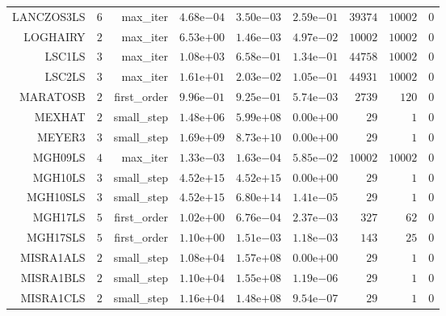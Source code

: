\begin{longtable}{rrrrrrrrr}
LANCZOS3LS & \(     6\) & max\_iter & \( 4.68\)e\(-04\) & \( 3.50\)e\(-03\) & \( 2.59\)e\(-01\) & \( 39374\) & \( 10002\) & \(     0\) \\
LOGHAIRY & \(     2\) & max\_iter & \( 6.53\)e\(+00\) & \( 1.46\)e\(-03\) & \( 4.97\)e\(-02\) & \( 10002\) & \( 10002\) & \(     0\) \\
LSC1LS & \(     3\) & max\_iter & \( 1.08\)e\(+03\) & \( 6.58\)e\(-01\) & \( 1.34\)e\(-01\) & \( 44758\) & \( 10002\) & \(     0\) \\
LSC2LS & \(     3\) & max\_iter & \( 1.61\)e\(+01\) & \( 2.03\)e\(-02\) & \( 1.05\)e\(-01\) & \( 44931\) & \( 10002\) & \(     0\) \\
MARATOSB & \(     2\) & first\_order & \( 9.96\)e\(-01\) & \( 9.25\)e\(-01\) & \( 5.74\)e\(-03\) & \(  2739\) & \(   120\) & \(     0\) \\
MEXHAT & \(     2\) & small\_step & \( 1.48\)e\(+06\) & \( 5.99\)e\(+08\) & \( 0.00\)e\(+00\) & \(    29\) & \(     1\) & \(     0\) \\
MEYER3 & \(     3\) & small\_step & \( 1.69\)e\(+09\) & \( 8.73\)e\(+10\) & \( 0.00\)e\(+00\) & \(    29\) & \(     1\) & \(     0\) \\
MGH09LS & \(     4\) & max\_iter & \( 1.33\)e\(-03\) & \( 1.63\)e\(-04\) & \( 5.85\)e\(-02\) & \( 10002\) & \( 10002\) & \(     0\) \\
MGH10LS & \(     3\) & small\_step & \( 4.52\)e\(+15\) & \( 4.52\)e\(+15\) & \( 0.00\)e\(+00\) & \(    29\) & \(     1\) & \(     0\) \\
MGH10SLS & \(     3\) & small\_step & \( 4.52\)e\(+15\) & \( 6.80\)e\(+14\) & \( 1.41\)e\(-05\) & \(    29\) & \(     1\) & \(     0\) \\
MGH17LS & \(     5\) & first\_order & \( 1.02\)e\(+00\) & \( 6.76\)e\(-04\) & \( 2.37\)e\(-03\) & \(   327\) & \(    62\) & \(     0\) \\
MGH17SLS & \(     5\) & first\_order & \( 1.10\)e\(+00\) & \( 1.51\)e\(-03\) & \( 1.18\)e\(-03\) & \(   143\) & \(    25\) & \(     0\) \\
MISRA1ALS & \(     2\) & small\_step & \( 1.08\)e\(+04\) & \( 1.57\)e\(+08\) & \( 0.00\)e\(+00\) & \(    29\) & \(     1\) & \(     0\) \\
MISRA1BLS & \(     2\) & small\_step & \( 1.10\)e\(+04\) & \( 1.55\)e\(+08\) & \( 1.19\)e\(-06\) & \(    29\) & \(     1\) & \(     0\) \\
MISRA1CLS & \(     2\) & small\_step & \( 1.16\)e\(+04\) & \( 1.48\)e\(+08\) & \( 9.54\)e\(-07\) & \(    29\) & \(     1\) & \(     0\) \\

\end{longtable}
